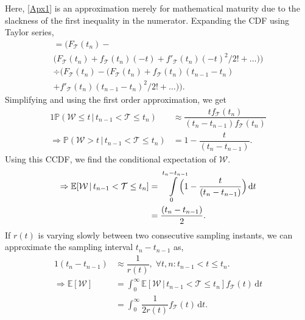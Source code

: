 Here, \cref{Apx1} is an approximation merely for mathematical maturity due to the slackness of the first inequality in the numerator.
Expanding the \ac{CDF} using Taylor series, 
\begin{multline*}
    =\Big(F_\mathcal{T}(t_n)-\\\big(F_\mathcal{T}(t_n)+f_\mathcal{T}(t_n)(-t)+f'_\mathcal{T}(t_n)(-t)^2/2!+\dots\big)\Big)\\
    \div \Big(F_\mathcal{T}(t_n)-\big(F_\mathcal{T}(t_n)+f_\mathcal{T}(t_n)(t_{n-1}-t_n)\\+f'_\mathcal{T}(t_n)(t_{n-1}-t_n)^2/2!+\dots\big)\Big).
\end{multline*}
Simplifying and using the first order approximation, we get
\begin{alignat*}{1}
\mathbb{P}(\mathcal{W}\leq t\,\big\vert\,t_{n-1}<\mathcal{T}\leq t_n)&\approx\dfrac{tf_\mathcal{T}(t_n)}{(t_{n}-t_{n-1})f_\mathcal{T}(t_n)}\tag{$A_2$}\label{Apx2}\\
\Rightarrow\mathbb{P}(\mathcal{W}> t\,|\,t_{n-1}<\mathcal{T}\leq t_n)&= 1-\dfrac{t}{(t_{n}-t_{n-1})}.
\end{alignat*}
Using this \ac{CCDF}, we find the conditional expectation of $\mathcal{W}$.
\begin{alignat*}{1}
\Rightarrow \mathbb{E}[\mathcal{W}\,|\,t_{n-1}<\mathcal{T}\leq t_n]&=\smashoperator[r]{\int_{0}^{t_n-t_{n-1}}}\Big(1-\dfrac{t}{(t_{n}-t_{n-1})}\Big)\,\mathrm{d}t\\
&=\dfrac{(t_n-t_{n-1})}{2}.
\end{alignat*}
If $r(t)$ is varying slowly between two consecutive sampling instants, we can approximate the sampling interval $t_n\!-\!t_{n-1}$ as,
\begin{alignat}{1}
 (t_n-t_{n-1})&\approx\dfrac{1}{r(t)},\;\forall t,n:t_{n-1}\!<\!t\!\leq\!t_n.\tag{$A_3$}\label{Apx3}\\
\Rightarrow \mathbb{E}[\mathcal{W}]&=\int_{0}^{\infty}\mathbb{E}[\mathcal{W}\,|\,t_{n-1}<\mathcal{T}\leq t_n]f_\mathcal{T}(t)\,\mathrm{d}t\nonumber\\
&=\int_{0}^{\infty}\dfrac{1}{2r(t)}f_\mathcal{T}(t)\,\mathrm{d}t.\label{Ew}
\end{alignat}
